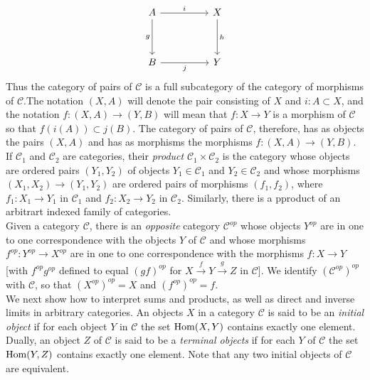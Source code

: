 \documentclass{article}
\begin{document}
\[\begin{tikzcd}
	A && X \\
	\\
	B && Y
	\arrow["i", from=1-1, to=1-3]
	\arrow["g"', from=1-1, to=3-1]
	\arrow["j"', from=3-1, to=3-3]
	\arrow["h", from=1-3, to=3-3]
\end{tikzcd}\]
Thus the category of pairs of $\mathscr{C}$ is a full subcategory of the category of morphisms of $\mathscr{C}$.The notation $(X,A)$ will denote the pair consisting of $X$ and $i : A \subset X$, and the notation $f : (X,A) \to (Y,B)$ will mean that $f : X \to Y$ is a morphism of $\mathscr{C}$ so that $f(i(A)) \subset j(B)$. The category of pairs of $\mathscr{C}$, therefore, has as objects the pairs $(X,A)$ and has as morphisms the morphisms $f: (X,A) \to (Y,B)$.\\
If $\mathscr{C}_1$ and $\mathscr{C}_2$ are categories, their \emph{product} $\mathscr{C}_1 \times \mathscr{C}_2$ is the category whose objects are ordered pairs $(Y_1,Y_2)$ of objects $Y_1 \in \mathscr{C}_1$ and $Y_2 \in \mathscr{C}_2$ and whose morphisms $(X_1,X_2) \to (Y_1,Y_2)$ are ordered pairs of morphisms $(f_1,f_2)$, where $f_1 : X_1 \to Y_1$ in $\mathscr{C}_1$ and $f_2 : X_2 \to Y_2$ in $\mathscr{C}_2$. Similarly, there is a pproduct of an arbitrart indexed family of categories.\\
Given a category $\mathscr{C}$, there is an \emph{opposite} category $\mathscr{C}^{op}$ whose objects $Y^{op}$ are in one to one correspondence with the objects $Y$ of $\mathscr{C}$ and whose morphisms $f^{op} : Y^{op} \to X^{op}$ are in one to one correspondence with the morphisms $f : X \to Y$[with $f^{op}g^{op}$ defined to equal $(gf)^{op}$ for $X \xrightarrow{f} Y \xrightarrow{g} Z$ in $\mathscr{C}$]. We identify $(\mathscr{C}^{op})^{op}$ with $\mathscr{C}$, so that $(X^{op})^{op} = X$ and $(f^{op})^{op} = f$.\\
We next show how to interpret sums and products, as well as direct and inverse limits in arbitrary categories. An objects $X$ in a category $\mathscr{C}$ is said to be an \emph{initial object} if for each object $Y$ in $\mathscr{C}$ the set $\operatorname{Hom}(X,Y)$ contains exactly one element. Dually, an object $Z$ of $\mathscr{C}$ is said to be a \emph{terminal objects} if for each $Y$ of $\mathscr{C}$ the set $\operatorname{Hom}(Y,Z)$ contains exactly one element. Note that any two initial objects of $\mathscr{C}$ are equivalent.\\
\end{document}
